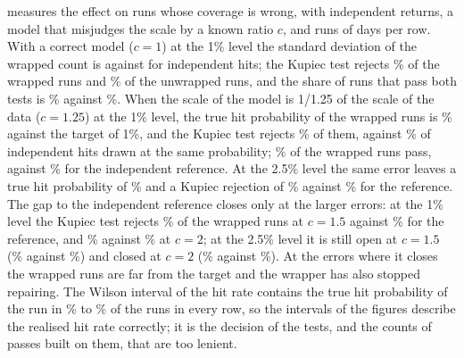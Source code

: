 

 measures the effect on runs whose coverage is wrong, with independent returns, a model that misjudges the scale by a known ratio $c$, and \dispBReps{} runs of \dispBDays{} days per row. With a correct model ($c = 1$) at the 1\% level the standard deviation of the wrapped count is \dispBOneOneAciCntSd{} against \dispBOneOneAciBinSd{} for independent hits; the Kupiec test rejects \dispBOneOneAciKupRej\% of the wrapped runs and \dispBOneOneUnwKupRej\% of the unwrapped runs, and the share of runs that pass both tests is \dispBOneOneAciPass\% against \dispBOneOneUnwPass\%. When the scale of the model is 1/1.25 of the scale of the data ($c = 1.25$) at the 1\% level, the true hit probability of the wrapped runs is \dispBOneOneTwoFiveAciTrueP\% against the target of 1\%, and the Kupiec test rejects \dispBOneOneTwoFiveAciKupRej\% of them, against \dispBOneOneTwoFiveAciRefKupRej\% of independent hits drawn at the same probability; \dispBOneOneTwoFiveAciPass\% of the wrapped runs pass, against \dispBOneOneTwoFiveAciRefPass\% for the independent reference. At the 2.5\% level the same error leaves a true hit probability of \dispBTwoHalfOneTwoFiveAciTrueP\% and a Kupiec rejection of \dispBTwoHalfOneTwoFiveAciKupRej\% against \dispBTwoHalfOneTwoFiveAciRefKupRej\% for the reference. The gap to the independent reference closes only at the larger errors: at the 1\% level the Kupiec test rejects \dispBOneOneFiveAciKupRej\% of the wrapped runs at $c = 1.5$ against \dispBOneOneFiveAciRefKupRej\% for the reference, and \dispBOneTwoAciKupRej\% against \dispBOneTwoAciRefKupRej\% at $c = 2$; at the 2.5\% level it is still open at $c = 1.5$ (\dispBTwoHalfOneFiveAciKupRej\% against \dispBTwoHalfOneFiveAciRefKupRej\%) and closed at $c = 2$ (\dispBTwoHalfTwoAciKupRej\% against \dispBTwoHalfTwoAciRefKupRej\%). At the errors where it closes the wrapped runs are far from the target and the wrapper has also stopped repairing. The Wilson interval of the hit rate contains the true hit probability of the run in \dispWilsonMin\% to \dispWilsonMax\% of the runs in every row, so the intervals of the figures describe the realised hit rate correctly; it is the decision of the tests, and the counts of passes built on them, that are too lenient.



